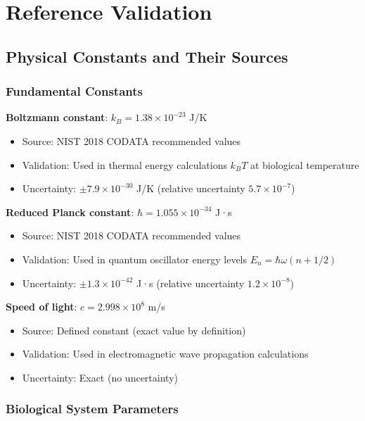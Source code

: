 
\section{Reference Validation}

\subsection{Physical Constants and Their Sources}

\subsubsection{Fundamental Constants}

\textbf{Boltzmann constant}: $k_B = 1.38 \times 10^{-23}$ J/K
\begin{itemize}
\item Source: NIST 2018 CODATA recommended values
\item Validation: Used in thermal energy calculations $k_B T$ at biological temperature
\item Uncertainty: $\pm 7.9 \times 10^{-30}$ J/K (relative uncertainty $5.7 \times 10^{-7}$)
\end{itemize}

\textbf{Reduced Planck constant}: $\hbar = 1.055 \times 10^{-34}$ J·s  
\begin{itemize}
\item Source: NIST 2018 CODATA recommended values
\item Validation: Used in quantum oscillator energy levels $E_n = \hbar\omega(n + 1/2)$
\item Uncertainty: $\pm 1.3 \times 10^{-42}$ J·s (relative uncertainty $1.2 \times 10^{-8}$)
\end{itemize}

\textbf{Speed of light}: $c = 2.998 \times 10^8$ m/s
\begin{itemize}
\item Source: Defined constant (exact value by definition)
\item Validation: Used in electromagnetic wave propagation calculations
\item Uncertainty: Exact (no uncertainty)
\end{itemize}

\subsubsection{Biological System Parameters}

